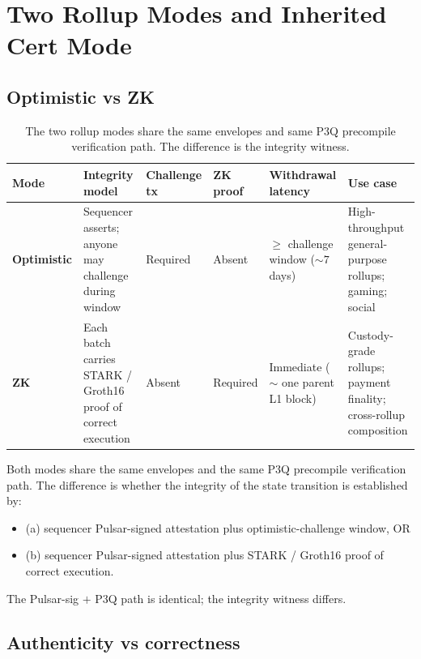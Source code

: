\section{Two Rollup Modes and Inherited Cert Mode}

\subsection{Optimistic vs ZK}

\begin{table}[h]
\centering
\small
\begin{tabular}{@{}p{2cm}p{3cm}p{1.8cm}p{1.5cm}p{2cm}p{2.5cm}@{}}
\toprule
\textbf{Mode} & \textbf{Integrity model} & \textbf{Challenge tx} & \textbf{ZK proof} & \textbf{Withdrawal latency} & \textbf{Use case} \\
\midrule
\textbf{Optimistic} & Sequencer asserts; anyone may challenge during window & Required & Absent & $\geq$ challenge window ($\sim 7$ days) & High-throughput general-purpose rollups; gaming; social \\
\textbf{ZK} & Each batch carries STARK / Groth16 proof of correct execution & Absent & Required & Immediate ($\sim$ one parent L1 block) & Custody-grade rollups; payment finality; cross-rollup composition \\
\bottomrule
\end{tabular}
\caption{The two rollup modes share the same envelopes and same P3Q
precompile verification path. The difference is the integrity
witness.}
\label{tab:rollup-modes}
\end{table}

Both modes share the same envelopes and the same P3Q precompile
verification path. The difference is whether the integrity of the
state transition is established by:

\begin{itemize}[leftmargin=2em,nosep]
\item (a) sequencer Pulsar-signed attestation plus
  optimistic-challenge window, OR
\item (b) sequencer Pulsar-signed attestation plus STARK /
  Groth16 proof of correct execution.
\end{itemize}

The Pulsar-sig $+$ P3Q path is identical; the integrity witness
differs.

\subsection{Authenticity vs correctness}

